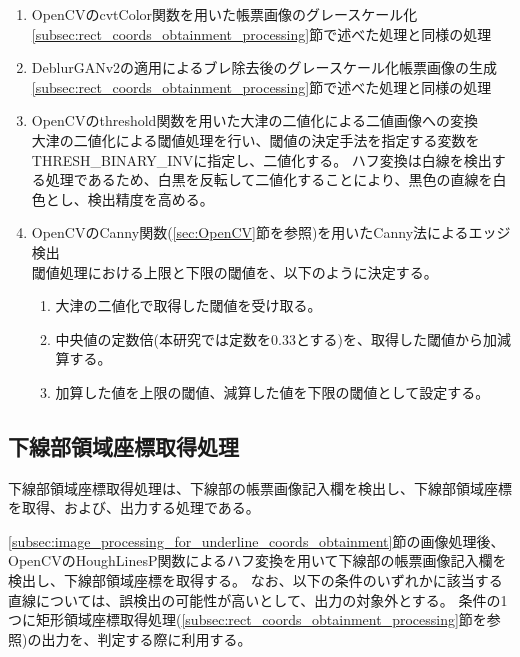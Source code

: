 \begin{enumerate}
    \item OpenCVのcvtColor関数を用いた帳票画像のグレースケール化\\
        \ref{subsec:rect_coords_obtainment_processing}節で述べた処理と同様の処理
    \item DeblurGANv2の適用によるブレ除去後のグレースケール化帳票画像の生成\\
        \ref{subsec:rect_coords_obtainment_processing}節で述べた処理と同様の処理
    \item OpenCVのthreshold関数を用いた大津の二値化による二値画像への変換\\
        大津の二値化による閾値処理を行い、閾値の決定手法を指定する変数をTHRESH\_BINARY\_INVに指定し、二値化する。
        ハフ変換は白線を検出する処理であるため、白黒を反転して二値化することにより、黒色の直線を白色とし、検出精度を高める。
    \item OpenCVのCanny関数(\ref{sec:OpenCV}節を参照)を用いたCanny法によるエッジ検出\\
        閾値処理における上限と下限の閾値を、以下のように決定する。
        \begin{enumerate}
            \item 大津の二値化で取得した閾値を受け取る。
            \item 中央値の定数倍(本研究では定数を0.33とする)を、取得した閾値から加減算する。
            \item 加算した値を上限の閾値、減算した値を下限の閾値として設定する。
        \end{enumerate}
\end{enumerate}


\subsection{下線部領域座標取得処理}\label{subsec:underline_coords_obtainment_processing}
下線部領域座標取得処理は、下線部の帳票画像記入欄を検出し、下線部領域座標を取得、および、出力する処理である。

\ref{subsec:image_processing_for_underline_coords_obtainment}節の画像処理後、OpenCVのHoughLinesP関数によるハフ変換を用いて下線部の帳票画像記入欄を検出し、下線部領域座標を取得する。
なお、以下の条件のいずれかに該当する直線については、誤検出の可能性が高いとして、出力の対象外とする。
条件の1つに矩形領域座標取得処理(\ref{subsec:rect_coords_obtainment_processing}節を参照)の出力を、判定する際に利用する。

